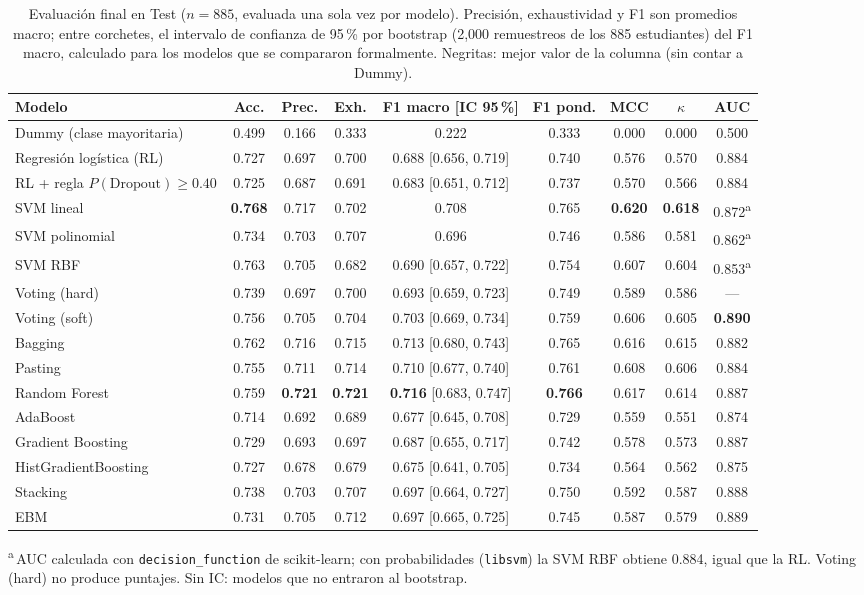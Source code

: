 \begin{table}[t]
\caption{Evaluación final en Test ($n=885$, evaluada una sola vez por modelo). Precisión, exhaustividad y F1 son promedios macro; entre corchetes, el intervalo de confianza de 95\,\% por bootstrap (2{,}000 remuestreos de los 885 estudiantes) del F1 macro, calculado para los modelos que se compararon formalmente. Negritas: mejor valor de la columna (sin contar a Dummy).}
\label{tab:test}
\centering\scriptsize
\setlength{\tabcolsep}{3pt}
\begin{tabular}{@{}lcccccccc@{}}
\toprule
Modelo & Acc. & Prec. & Exh. & F1 macro [IC 95\,\%] & F1 pond. & MCC & $\kappa$ & AUC \\
\midrule
Dummy (clase mayoritaria) & 0.499 & 0.166 & 0.333 & 0.222  & 0.333 & 0.000 & 0.000 & 0.500 \\
Regresión logística (RL) & 0.727 & 0.697 & 0.700 & 0.688 [0.656, 0.719] & 0.740 & 0.576 & 0.570 & 0.884 \\
RL + regla $P(\mathrm{Dropout})\geq0.40$ & 0.725 & 0.687 & 0.691 & 0.683 [0.651, 0.712] & 0.737 & 0.570 & 0.566 & 0.884 \\
SVM lineal & \textbf{0.768} & 0.717 & 0.702 & 0.708  & 0.765 & \textbf{0.620} & \textbf{0.618} & 0.872\textsuperscript{a} \\
SVM polinomial & 0.734 & 0.703 & 0.707 & 0.696  & 0.746 & 0.586 & 0.581 & 0.862\textsuperscript{a} \\
SVM RBF & 0.763 & 0.705 & 0.682 & 0.690 [0.657, 0.722] & 0.754 & 0.607 & 0.604 & 0.853\textsuperscript{a} \\
Voting (hard) & 0.739 & 0.697 & 0.700 & 0.693 [0.659, 0.723] & 0.749 & 0.589 & 0.586 & --- \\
Voting (soft) & 0.756 & 0.705 & 0.704 & 0.703 [0.669, 0.734] & 0.759 & 0.606 & 0.605 & \textbf{0.890} \\
Bagging & 0.762 & 0.716 & 0.715 & 0.713 [0.680, 0.743] & 0.765 & 0.616 & 0.615 & 0.882 \\
Pasting & 0.755 & 0.711 & 0.714 & 0.710 [0.677, 0.740] & 0.761 & 0.608 & 0.606 & 0.884 \\
Random Forest & 0.759 & \textbf{0.721} & \textbf{0.721} & \textbf{0.716} [0.683, 0.747] & \textbf{0.766} & 0.617 & 0.614 & 0.887 \\
AdaBoost & 0.714 & 0.692 & 0.689 & 0.677 [0.645, 0.708] & 0.729 & 0.559 & 0.551 & 0.874 \\
Gradient Boosting & 0.729 & 0.693 & 0.697 & 0.687 [0.655, 0.717] & 0.742 & 0.578 & 0.573 & 0.887 \\
HistGradientBoosting & 0.727 & 0.678 & 0.679 & 0.675 [0.641, 0.705] & 0.734 & 0.564 & 0.562 & 0.875 \\
Stacking & 0.738 & 0.703 & 0.707 & 0.697 [0.664, 0.727] & 0.750 & 0.592 & 0.587 & 0.888 \\
EBM & 0.731 & 0.705 & 0.712 & 0.697 [0.665, 0.725] & 0.745 & 0.587 & 0.579 & 0.889 \\
\bottomrule
\end{tabular}

\vspace{2pt}
\raggedright\scriptsize\textsuperscript{a}\,AUC calculada con \texttt{decision\_function} de scikit-learn; con probabilidades (\texttt{libsvm}) la SVM RBF obtiene 0.884, igual que la RL. Voting (hard) no produce puntajes. Sin IC: modelos que no entraron al bootstrap.
\end{table}
